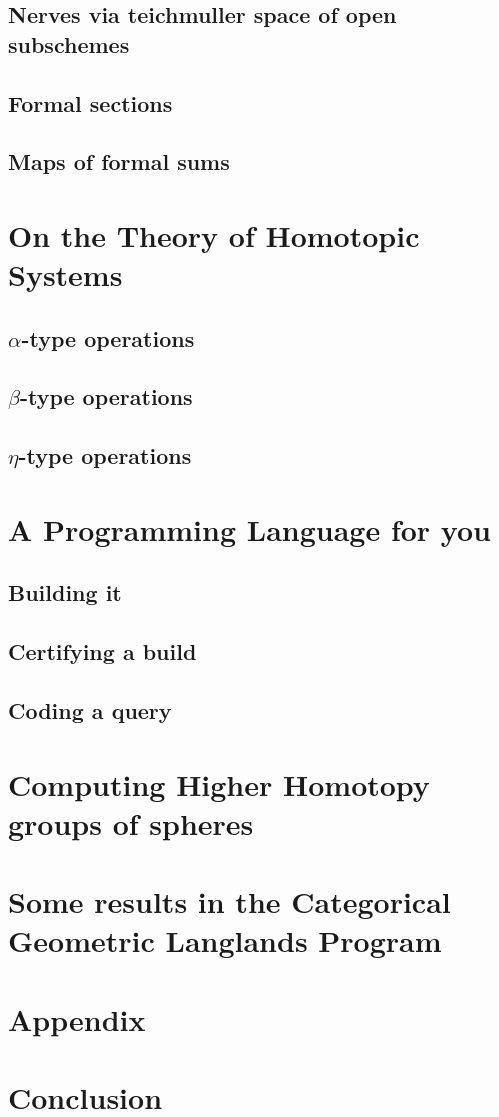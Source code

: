 \documentclass{article}
\begin{document}
\subsection{Nerves via teichmuller space of open subschemes}
\subsection{Formal sections}
\subsection{Maps of formal sums}

\section{On the Theory of Homotopic Systems}
\subsection{$\alpha$-type operations}
\subsection{$\beta$-type operations}
\subsection{$\eta$-type operations}

\section{A Programming Language for you}
\subsection{Building it}
\subsection{Certifying a build}
\subsection{Coding a query}

\section{Computing Higher Homotopy groups of spheres}


\section{Some results in the Categorical Geometric Langlands Program}

\section{Appendix}



\section{Conclusion}
\end{document}
